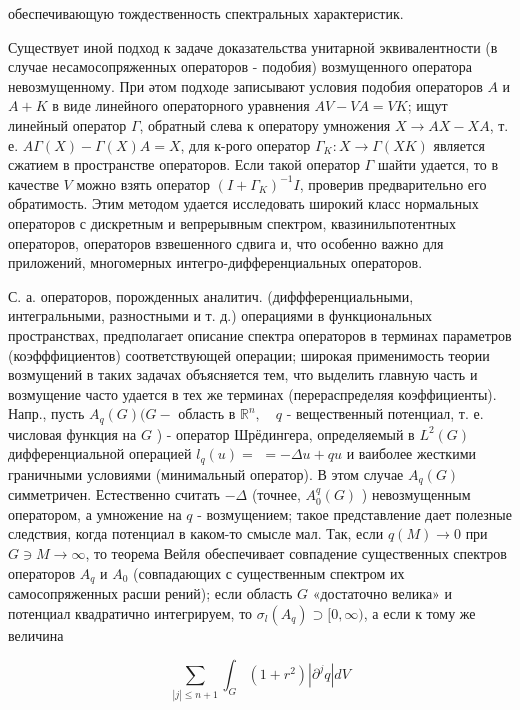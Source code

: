 \documentclass[10pt]{article}
\begin{document}
обеспечивающую тождественность спектральных характеристик.



Существует иной подход к задаче доказательства унитарной эквивалентности (в случае несамосопряженных операторов - подобия) возмущенного оператора невозмущенному. При әтом подходе записывают условия подобия операторов $A$ и $A+K$ в виде линейного операторного уравнения $A V-V A=V K$; ищут линейный оператор $\Gamma$, обратный слева к оператору умножения $X \rightarrow A X-X A$, т. е. $A \Gamma(X)-\Gamma(X) A=X$, для к-рого оператор $\Gamma_{K}: X \rightarrow \Gamma(X K)$ является сжатием в пространстве операторов. Если такой оператор $\Gamma$ шайти удается, то в качестве $V$ можно взять оператор $\left(I+\Gamma_{K}\right)^{-1} I$, проверив предварительно его обратимость. Этим методом удается исследовать широкий класс нормальных операторов с дискретным и вепрерывным спектром, квазинильпотентных операторов, операторов взвешенного сдвига и, что особенно важно для приложений, многомерных интегро-дифференциальных операторов.



С. а. операторов, порожденных аналитич. (диффференциальными, интегральными, разностными и т. д.) операциями в функциональных пространствах, предполагает описание спектра операторов в терминах параметров (коэфффициентов) соответствующей операции; широкая применимость теории возмущений в таких задачах объясняется тем, что выделить главную часть и возмущение часто удается в тех же терминах (перераспределяя коэффициенты). Напр., пусть $A_{q}(G)(G-$ область в $\mathbb{R}^{n}, \quad q$ - вещественный потенциал, т. е. числовая функция на $G$ ) - оператор Шрёдингера, определяемый в $L^{2}(G)$ дифференциальной операцией $l_{q}(u)=$ $=-\Delta u+q u$ и ваиболее жесткими граничными условиями (минимальный оператор). В этом случае $A_{q}(G)$ симметричен. Естественно считать $-\Delta$ (точнее, $A_{0}^{q}(G)$ ) невозмущенным оператором, а умножение на $q$ - возмущением; такое представление дает полезные следствия, когда потенциал в каком-то смысле мал. Так, если $q(M) \rightarrow 0$ при $G \ni M \rightarrow \infty$, то теорема Вейля обеспечивает совпадение существенных спектров операторов $A_{q}$ и $A_{0}$ (совпадающих с существенным спектром их самосопряженных расши рений); если область $G$ «достаточно велика» и потенциал квадратично интегрируем, то $\sigma_{l}\left(A_{q}\right) \supset[0, \infty)$, а если к тому же величина



\[

\sum_{|j| \leqslant n+1} \int_{G}\left(1+r^{2}\right)\left|\partial^{j} q\right| d V

\]
\end{document}
